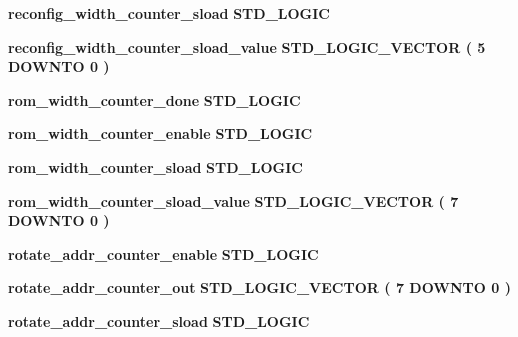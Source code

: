 \begin{DoxyCompactItemize}
\item 
{\bf reconfig\+\_\+width\+\_\+counter\+\_\+sload} {\bfseries \textcolor{comment}{S\+T\+D\+\_\+\+L\+O\+G\+IC}\textcolor{vhdlchar}{ }} 
\item 
{\bf reconfig\+\_\+width\+\_\+counter\+\_\+sload\+\_\+value} {\bfseries \textcolor{comment}{S\+T\+D\+\_\+\+L\+O\+G\+I\+C\+\_\+\+V\+E\+C\+T\+OR}\textcolor{vhdlchar}{ }\textcolor{vhdlchar}{(}\textcolor{vhdlchar}{ }\textcolor{vhdlchar}{ } \textcolor{vhdldigit}{5} \textcolor{vhdlchar}{ }\textcolor{keywordflow}{D\+O\+W\+N\+TO}\textcolor{vhdlchar}{ }\textcolor{vhdlchar}{ } \textcolor{vhdldigit}{0} \textcolor{vhdlchar}{ }\textcolor{vhdlchar}{)}\textcolor{vhdlchar}{ }} 
\item 
{\bf rom\+\_\+width\+\_\+counter\+\_\+done} {\bfseries \textcolor{comment}{S\+T\+D\+\_\+\+L\+O\+G\+IC}\textcolor{vhdlchar}{ }} 
\item 
{\bf rom\+\_\+width\+\_\+counter\+\_\+enable} {\bfseries \textcolor{comment}{S\+T\+D\+\_\+\+L\+O\+G\+IC}\textcolor{vhdlchar}{ }} 
\item 
{\bf rom\+\_\+width\+\_\+counter\+\_\+sload} {\bfseries \textcolor{comment}{S\+T\+D\+\_\+\+L\+O\+G\+IC}\textcolor{vhdlchar}{ }} 
\item 
{\bf rom\+\_\+width\+\_\+counter\+\_\+sload\+\_\+value} {\bfseries \textcolor{comment}{S\+T\+D\+\_\+\+L\+O\+G\+I\+C\+\_\+\+V\+E\+C\+T\+OR}\textcolor{vhdlchar}{ }\textcolor{vhdlchar}{(}\textcolor{vhdlchar}{ }\textcolor{vhdlchar}{ } \textcolor{vhdldigit}{7} \textcolor{vhdlchar}{ }\textcolor{keywordflow}{D\+O\+W\+N\+TO}\textcolor{vhdlchar}{ }\textcolor{vhdlchar}{ } \textcolor{vhdldigit}{0} \textcolor{vhdlchar}{ }\textcolor{vhdlchar}{)}\textcolor{vhdlchar}{ }} 
\item 
{\bf rotate\+\_\+addr\+\_\+counter\+\_\+enable} {\bfseries \textcolor{comment}{S\+T\+D\+\_\+\+L\+O\+G\+IC}\textcolor{vhdlchar}{ }} 
\item 
{\bf rotate\+\_\+addr\+\_\+counter\+\_\+out} {\bfseries \textcolor{comment}{S\+T\+D\+\_\+\+L\+O\+G\+I\+C\+\_\+\+V\+E\+C\+T\+OR}\textcolor{vhdlchar}{ }\textcolor{vhdlchar}{(}\textcolor{vhdlchar}{ }\textcolor{vhdlchar}{ } \textcolor{vhdldigit}{7} \textcolor{vhdlchar}{ }\textcolor{keywordflow}{D\+O\+W\+N\+TO}\textcolor{vhdlchar}{ }\textcolor{vhdlchar}{ } \textcolor{vhdldigit}{0} \textcolor{vhdlchar}{ }\textcolor{vhdlchar}{)}\textcolor{vhdlchar}{ }} 
\item 
{\bf rotate\+\_\+addr\+\_\+counter\+\_\+sload} {\bfseries \textcolor{comment}{S\+T\+D\+\_\+\+L\+O\+G\+IC}\textcolor{vhdlchar}{ }} 
\item 

\end{DoxyCompactItemize}
